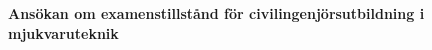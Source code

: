 
\newsavebox{\mybox}
\newlength{\mydepth}
\newlength{\myheight}

\newenvironment{tassel}
{\begin{lrbox}{\mybox}\begin{minipage}{\textwidth}}
{\end{minipage}\end{lrbox}
 \settodepth{\mydepth}{\usebox{\mybox}}
 \settoheight{\myheight}{\usebox{\mybox}}
 \addtolength{\myheight}{\mydepth}
 \noindent\makebox[0pt]{\hspace{-20pt} %
 \rule[-\mydepth]{1pt}{\myheight}} %
 \usebox{\mybox}}

\begin{titlepage}

\setlength{\wpXoffset}{-8.3cm}
\setlength{\wpYoffset}{12.5cm}


\begin{tassel}
    \vspace{7.5cm} %
    \huge \textbf{Ansökan om examenstillstånd för civilingenjörsutbildning i mjukvaruteknik}
 \end{tassel}



\null
\vfill

\end{titlepage}

\restoregeometry
